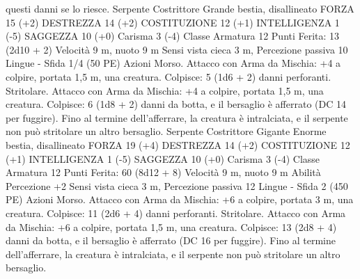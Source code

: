 \begin{multicols}{2}
questi danni se lo riesce.
Serpente Costrittore
Grande bestia, disallineato
FORZA 15 (+2)
DESTREZZA 14 (+2)
COSTITUZIONE 12 (+1)
INTELLIGENZA 1 (-5)
SAGGEZZA 10 (+0)
Carisma 3 (-4)
Classe Armatura 12
\hspace*{0pt}\hfill{Punti Ferita}: 13 (2d10 + 2)
Velocità 9 m, nuoto 9 m
Sensi vista cieca 3 m, Percezione passiva 10
Lingue -
Sfida 1/4 (50 PE)
Azioni
Morso. Attacco con Arma da Mischia: +4 a colpire, portata 1,5
m, una creatura.
Colpisce: 5 (1d6 + 2) danni perforanti.
Stritolare. Attacco con Arma da Mischia: +4 a colpire, portata
1,5 m, una creatura.
Colpisce: 6 (1d8 + 2) danni da botta, e il bersaglio è afferrato
(DC 14 per fuggire). Fino al termine dell’afferrare, la creatura è
intralciata, e il serpente non può stritolare un altro bersaglio.
Serpente Costrittore
Gigante
Enorme bestia, disallineato
FORZA 19 (+4)
DESTREZZA 14 (+2)
COSTITUZIONE 12 (+1)
INTELLIGENZA 1 (-5)
SAGGEZZA 10 (+0)
Carisma 3 (-4)
Classe Armatura 12
\hspace*{0pt}\hfill{Punti Ferita}: 60 (8d12 + 8)
Velocità 9 m, nuoto 9 m
Abilità Percezione +2
Sensi vista cieca 3 m, Percezione passiva 12
Lingue -
Sfida 2 (450 PE)
Azioni
Morso. Attacco con Arma da Mischia: +6 a colpire, portata 3 m,
una creatura.
Colpisce: 11 (2d6 + 4) danni perforanti.
Stritolare. Attacco con Arma da Mischia: +6 a colpire, portata
1,5 m, una creatura.
Colpisce: 13 (2d8 + 4) danni da botta, e il bersaglio è
afferrato (DC 16 per fuggire). Fino al termine dell’afferrare, la
creatura è intralciata, e il serpente non può stritolare un altro
bersaglio.
 

\end{multicols}
